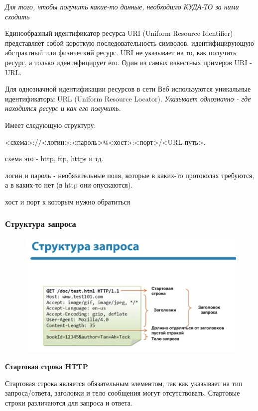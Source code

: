 \documentclass[a4paper,12pt]{article}
\begin{document}
	\textit{Для того, чтобы получить какие-то данные, необходимо КУДА-ТО за ними сходить}
	
	Единообразный идентификатор ресурса URI (Uniform Resource Identifier) представляет собой короткую последовательность символов, идентифицирующую абстрактный или физический ресурс. URI не указывает на то, как получить ресурс, а только идентифицирует его. Один из самых известных примеров URI - URL.
	
	Для однозначной идентификации ресурсов в сети Веб используются уникальные идентификаторы URL (Uniform Resource Locator). \textit{Указывает однозначно - где находится ресурс и как его получить.}
	
	Имеет следующую структуру:
	
	<схема>://<логин>:<пароль>@<хост>:<порт>/<URL-путь>.
	
	схема это - http, ftp, https и тд.
	
	логин и пароль - необязательные поля, которые в каких-то протоколах требуются, а в каких-то нет (в http они опускаются).
	
	хост и порт к которым нужно обратиться
	
	
	
	\subsubsection{Структура запроса}
	
	\begin{figure}[h!]
		\begin{center}
			{\includegraphics[scale = 1]{12.png}}
			\label{12}
		\end{center}
	\end{figure}

	{\bf Стартовая строка HTTP}
	
	Стартовая строка является обязательным элементом, так как указывает на тип запроса/ответа, заголовки и тело сообщения могут отсутствовать. Стартовые строки различаются для запроса и ответа.
	
\end{document}
